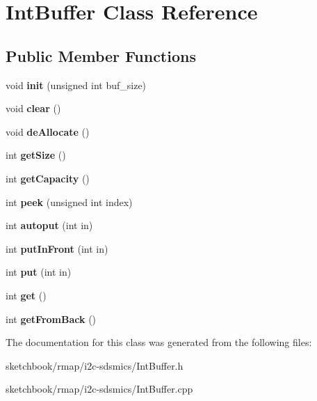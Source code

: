 \hypertarget{classIntBuffer}{}\section{Int\+Buffer Class Reference}
\label{classIntBuffer}
\subsection*{Public Member Functions}
\begin{DoxyCompactItemize}
\item 
\mbox{\label{classIntBuffer_adad5774a4d0eeb4255fc7ae5d1483584}} 
void {\bfseries init} (unsigned int buf\+\_\+size)
\item 
\mbox{\label{classIntBuffer_a5b4a602cf89c7854bc7353931808d3ab}} 
void {\bfseries clear} ()
\item 
\mbox{\label{classIntBuffer_a9337106cce14c33c912b8329b75c7188}} 
void {\bfseries de\+Allocate} ()
\item 
\mbox{\label{classIntBuffer_a5ec3f3e1e1d38863be24413f3aa048a6}} 
int {\bfseries get\+Size} ()
\item 
\mbox{\label{classIntBuffer_ad5729a80e1fa0735f27e63a439bb3b85}} 
int {\bfseries get\+Capacity} ()
\item 
\mbox{\label{classIntBuffer_a4aadba600d4ebadcdbd85bd71746934f}} 
int {\bfseries peek} (unsigned int index)
\item 
\mbox{\label{classIntBuffer_af0590be706336d775b0b3f87782c202c}} 
int {\bfseries autoput} (int in)
\item 
\mbox{\label{classIntBuffer_a25943bbe9c91b6aa7f3d4b3a1200e96e}} 
int {\bfseries put\+In\+Front} (int in)
\item 
\mbox{\label{classIntBuffer_a9f1eec86f7b23d5803368d9131dd8ff6}} 
int {\bfseries put} (int in)
\item 
\mbox{\label{classIntBuffer_a086965ee3e53f15328d169a6f63e3673}} 
int {\bfseries get} ()
\item 
\mbox{\label{classIntBuffer_a413dd31e7d5f25ca5a94d9907fbf947e}} 
int {\bfseries get\+From\+Back} ()
\end{DoxyCompactItemize}


The documentation for this class was generated from the following files\+:\begin{DoxyCompactItemize}
\item 
sketchbook/rmap/i2c-\/sdsmics/Int\+Buffer.\+h\item 
sketchbook/rmap/i2c-\/sdsmics/Int\+Buffer.\+cpp\end{DoxyCompactItemize}
